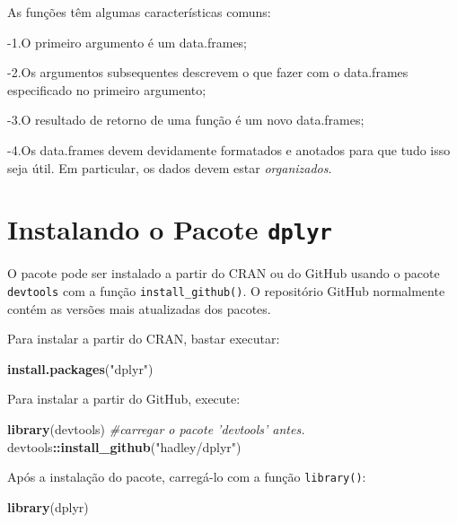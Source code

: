 \documentclass[]{book}
\newenvironment{Shaded}{\begin{snugshade}}{\end{snugshade}}
\newcommand{\CommentTok}[1]{\textcolor[rgb]{0.56,0.35,0.01}{\textit{#1}}}
\newcommand{\KeywordTok}[1]{\textcolor[rgb]{0.13,0.29,0.53}{\textbf{#1}}}
\newcommand{\NormalTok}[1]{#1}
\newcommand{\OperatorTok}[1]{\textcolor[rgb]{0.81,0.36,0.00}{\textbf{#1}}}
\newcommand{\StringTok}[1]{\textcolor[rgb]{0.31,0.60,0.02}{#1}}
\begin{document}
As funções têm algumas características comuns:

-1.O primeiro argumento é um data.frames;

-2.Os argumentos subsequentes descrevem o que fazer com o data.frames especificado no primeiro argumento;

-3.O resultado de retorno de uma função é um novo data.frames;

-4.Os data.frames devem devidamente formatados e anotados para que tudo isso seja útil. Em particular, os dados devem estar \emph{organizados}.

\hypertarget{instalando-o-pacote-dplyr}{%
\section{\texorpdfstring{Instalando o Pacote \texttt{dplyr}}{Instalando o Pacote dplyr}}\label{instalando-o-pacote-dplyr}}

O pacote pode ser instalado a partir do CRAN ou do GitHub usando o pacote \texttt{devtools} com a função \texttt{install\_github()}. O repositório GitHub normalmente contém as versões mais atualizadas dos pacotes.

Para instalar a partir do CRAN, bastar executar:

\begin{Shaded}
\begin{Highlighting}[]
\KeywordTok{install.packages}\NormalTok{(}\StringTok{"dplyr"}\NormalTok{)}
\end{Highlighting}
\end{Shaded}

Para instalar a partir do GitHub, execute:

\begin{Shaded}
\begin{Highlighting}[]
\KeywordTok{library}\NormalTok{(devtools) }\CommentTok{#carregar o pacote 'devtools' antes.}
\NormalTok{devtools}\OperatorTok{::}\KeywordTok{install_github}\NormalTok{(}\StringTok{"hadley/dplyr"}\NormalTok{)}
\end{Highlighting}
\end{Shaded}

Após a instalação do pacote, carregá-lo com a função \texttt{library()}:

\begin{Shaded}
\begin{Highlighting}[]
\KeywordTok{library}\NormalTok{(dplyr)}
\end{Highlighting}
\end{Shaded}
\end{document}

